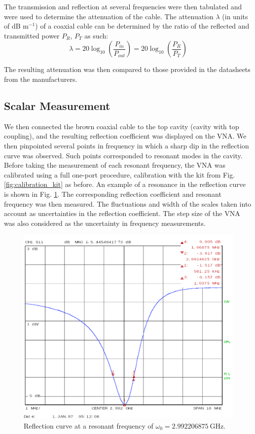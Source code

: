 \documentclass[a4paper]{article}
\numberwithin{equation}{section}
\begin{document}
The transmission and reflection at several frequencies were then tabulated and were used to determine the attenuation
of the cable. The attenuation $\lambda$ (in units of dB m$^{-1}$) of a coaxial cable can be determined by the ratio of the
reflected and transmitted power $P_R$, $P_T$ as such:
\begin{equation}
	\lambda = 20 \log_{10}\left(\frac{P_{in}}{P_{out}}\right) = 20 \log_{10}\left(\frac{P_R}{P_T}\right)
\end{equation} 

The resulting attenuation was then compared to those provided in the datasheets
from the manufacturers.\par 

\subsection{Scalar Measurement}

We then connected the brown coaxial cable to the top cavity (cavity with top
coupling), and the resulting reflection coefficient was displayed on the VNA.
We then pinpointed several points in frequency in which a sharp dip in the
reflection curve was observed. Such points corresponded to 
resonant modes in the cavity. Before taking the measurement of each resonant frequency, the VNA was calibrated
using a full one-port procedure, calibration with the kit from Fig.
\ref{fig:calibration_kit} as before. An example of a resonance in the
reflection curve is shown in Fig. \ref{fig:resonance_raw}. The corresponding
reflection coefficient and resonant frequency was then measured. The
fluctuations and width of the scales taken into account as uncertainties in the
reflection coefficient. The step size of the VNA was also considered as the
uncertainty in frequency measurements.
\par 

\begin{figure}[hbt!]
	\centering
	\includegraphics[width=0.6\columnwidth]{resonant1.1.png}
	\caption{Reflection curve at a resonant frequency of $\omega_0 =
	\SI{2.992206875}{\giga\hertz}$. }

	\label{fig:resonance_raw}
\end{figure}
\end{document}

